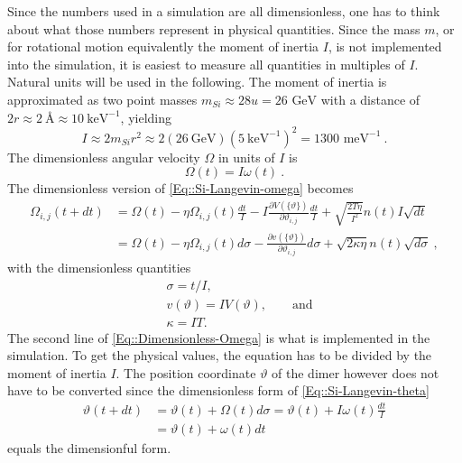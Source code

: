 	Since the numbers used in a simulation are all dimensionless, one has to think about what those numbers represent in physical quantities. Since the mass $m$, or for rotational motion equivalently the moment of inertia $I$, is not implemented into the simulation, it is easiest to measure all quantities in multiples of $I$. Natural units will be used in the following. The moment of inertia is approximated as two point masses $m_{Si} \approx 28u =	26 \text{ GeV}$ with a distance of $2r \approx 2 ~\text{\AA} \approx 10~ \text{keV}^{-1}$, yielding
	\begin{equation}
		I \approx 2m_{Si} r^2 \approx	2 \left(26 ~\text{GeV}\right) \left(5 ~\text{keV}^{-1}\right)^2 =	1300 \text{ meV}^{-1}~.
	\end{equation} 
	The dimensionless angular velocity $\Omega$ in units of $I$ is 
	\begin{equation}
		\Omega(t) =	I\omega(t)~.
	\end{equation}
	The dimensionless version of \autoref{Eq::Si-Langevin-omega} becomes
	\begin{equation} \label{Eq::Dimensionless-Omega}
		\begin{split}
			\Omega_{i,j}(t + dt) &=	\Omega(t) - \eta \Omega_{i,j}(t) \frac{dt}{I} - {I}\frac{\partial V(\{\vartheta\})}{\partial \vartheta_{i,j}} \frac{dt}{I} + \sqrt{\frac{2 T \eta}{I^2}} n(t) I \sqrt{dt} \\
			&=	\Omega(t) - \eta \Omega_{i,j}(t) d\sigma - \frac{\partial v(\{\vartheta\})}{\partial \vartheta_{i,j}} d\sigma + \sqrt{{2 \kappa \eta}} n(t) \sqrt{d\sigma}~,
		\end{split}
	\end{equation}
	with the dimensionless quantities
	\begin{align}
		&\sigma =	t /	I, \\
		&v(\vartheta) =	I V(\vartheta), \qquad \text{and} \\
		&\kappa =	IT.
	\end{align}
	The second line of \autoref{Eq::Dimensionless-Omega} is what is implemented in the simulation. To get the physical values, the equation has to be divided by the moment of inertia $I$. The position coordinate $\vartheta$ of the dimer however does not have to be converted since the dimensionless form of \autoref{Eq::Si-Langevin-theta}
	\begin{equation}
		\begin{split}
			\vartheta(t + dt) &=	\vartheta(t) + \Omega(t) d\sigma =	\vartheta(t) + I \omega(t) \frac{dt}{I} \\
			&= \vartheta(t) + \omega(t) dt
		\end{split}
	\end{equation}
	equals the dimensionful form. \\
	

